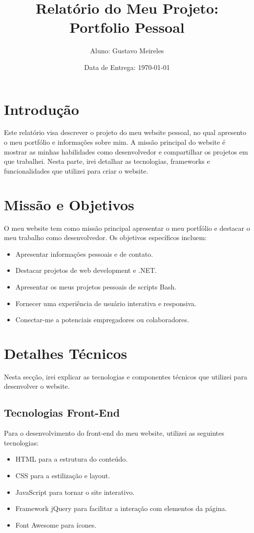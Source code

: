 \documentclass{article}
\title{Relatório do Meu Projeto: Portfolio Pessoal}
\author{Aluno: Gustavo Meireles}
\date{Data de Entrega: \today}
\begin{document}
\maketitle

\tableofcontents
\newpage

\section{Introdução}
Este relatório visa descrever o projeto do meu website pessoal, no qual apresento o meu portfólio e informações sobre mim. A missão principal do website é mostrar as minhas habilidades como desenvolvedor e compartilhar os projetos em que trabalhei. Nesta parte, irei detalhar as tecnologias, frameworks e funcionalidades que utilizei para criar o website.

\section{Missão e Objetivos}
O meu website tem como missão principal apresentar o meu portfólio e destacar o meu trabalho como desenvolvedor. Os objetivos específicos incluem:

\begin{itemize}
    \item Apresentar informações pessoais e de contato.
    \item Destacar projetos de web development e .NET.
    \item Apresentar os meus projetos pessoais de scripts Bash.
    \item Fornecer uma experiência de usuário interativa e responsiva.
    \item Conectar-me a potenciais empregadores ou colaboradores.
\end{itemize}

\section{Detalhes Técnicos}
Nesta secção, irei explicar as tecnologias e componentes técnicos que utilizei para desenvolver o website.

\subsection{Tecnologias Front-End}
Para o desenvolvimento do front-end do meu website, utilizei as seguintes tecnologias:

\begin{itemize}
    \item HTML para a estrutura do conteúdo.
    \item CSS para a estilização e layout.
    \item JavaScript para tornar o site interativo.
    \item Framework jQuery para facilitar a interação com elementos da página.
    \item Font Awesome para ícones.
\end{itemize}
\end{document}
